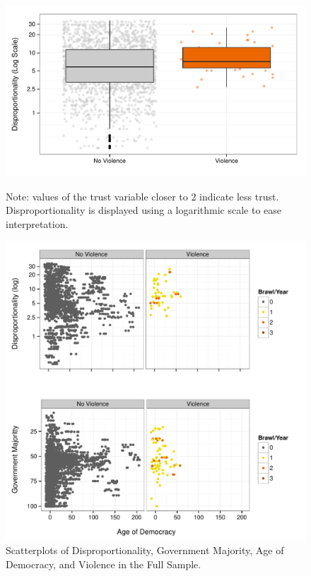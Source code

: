 \documentclass[a4paper]{article}\usepackage{graphicx, color}
\newenvironment{knitrout}{}{} %
\begin{document}
{{\begin{figure}[t]
\begin{center}
\begin{knitrout}
\color{fgcolor}
\includegraphics[width=0.8\linewidth]{figure/boxplot} 

\end{knitrout}

    \end{center}
    \begin{singlespace}
        {\scriptsize{Note: values of the trust variable closer to 2 indicate less trust. Disproportionality is displayed using a logarithmic scale to ease interpretation. }}
    \end{singlespace}
\end{figure}

\begin{figure}[t]
    \caption{Scatterplots of Disproportionality, Government Majority, Age of Democracy, and Violence in the Full Sample.}  
    \label{framework_empirical}
    \begin{center}

\begin{knitrout}
\color{fgcolor}
\includegraphics[width=0.8\linewidth]{figure/FrameworkEmpirical} 


\end{knitrout}
\end{center}
\end{figure}}}
\end{document}

